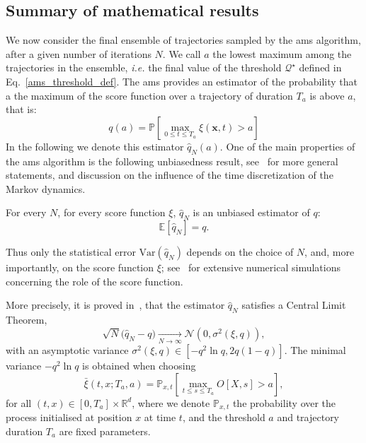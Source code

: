 \subsection{Summary of mathematical results}
We now consider the final ensemble of trajectories sampled by the \ac{ams} algorithm, after a given number
of iterations $N$.
We call $a$ the lowest maximum among the trajectories in the ensemble, \textit{i.e.} the final value of the threshold $\mathcal{Q}^{\star}$ defined in Eq.~\eqref{ams_threshold_def}.
The \ac{ams} provides an estimator of the probability that a the maximum of the score function over a trajectory of duration $T_a$ is above $a$, that is:
\begin{equation}
  \label{eq:estimator_ams}
  q(a) = \mathbb{P}\left[ \underset{0\leq t \leq T_a}{\max} \xi(\mathbf{x}, t) > a \right]
\end{equation}
In the following we denote this estimator $\hat{q}_N(a)$.
One of the main properties of the \ac{ams} algorithm is the following unbiasedness result, see~\cite{Brehier2016a} for more general statements, and discussion on the influence of the time discretization of the Markov dynamics.
\begin{theo}
  For every $N$, for every score function $\xi$, $\hat{q}_N$ is an unbiased estimator of $q$:
  \begin{equation}
    \mathbb{E}[\hat{q}_N]=q.
  \end{equation}
\end{theo}
Thus only the statistical error $\text{Var}(\hat{q}_N)$ depends on the choice of $N$, and, more importantly, on the score function $\xi$; see~\cite{Brehier2016a,Rolland2015} for extensive numerical simulations concerning the role of the score function.

More precisely, it is proved in~\cite{Cerou2016}, that the estimator $\hat{q}_N$ satisfies a Central Limit Theorem,
\begin{equation}
  \sqrt{N}\bigl(\hat{q}_N-q\bigr)\underset{N\to \infty}\to\mathcal{N}(0,\sigma^2(\xi,q)),
\end{equation}
with an asymptotic variance $\sigma^2(\xi,q)\in [-q^2\ln q,2q(1-q)]$.
The minimal variance $-q^2\ln q$ is obtained when choosing
\begin{equation}
  \bar{\xi}(t,x;T_a,a)=\mathbb{P}_{x,t}\left\lbrack\underset{t\le s\le T_a}\max O[X,s] > a\right\rbrack,
  \label{eq:time_dependent_committor}
\end{equation}
for all $(t,x)\in[0,T_a]\times \mathbb{R}^d$, where we denote $\mathbb{P}_{x,t}$ the probability over the process initialised at position $x$ at time $t$, and the threshold $a$ and trajectory duration $T_a$ are fixed parameters.



